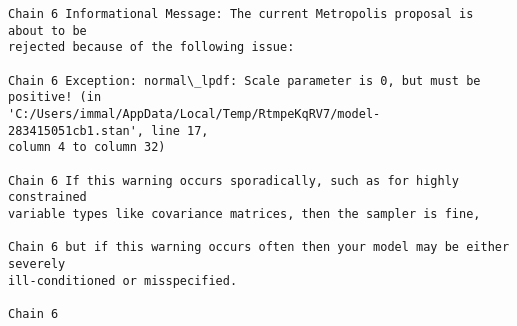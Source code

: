 \documentclass[11pt]{article}
\begin{document}
    \begin{Verbatim}[commandchars=\\\{\}]
Chain 6 Informational Message: The current Metropolis proposal is about to be
rejected because of the following issue:

Chain 6 Exception: normal\_lpdf: Scale parameter is 0, but must be positive! (in
'C:/Users/immal/AppData/Local/Temp/RtmpeKqRV7/model-283415051cb1.stan', line 17,
column 4 to column 32)

Chain 6 If this warning occurs sporadically, such as for highly constrained
variable types like covariance matrices, then the sampler is fine,

Chain 6 but if this warning occurs often then your model may be either severely
ill-conditioned or misspecified.

Chain 6

    \end{Verbatim}
\end{document}
